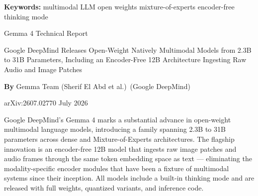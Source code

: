 \documentclass[10pt,twocolumn]{article}
\begin{document}
\setlength{\parindent}{0pt}
\setlength{\parskip}{4pt}

{\small\color{keywordgray}\textbf{Keywords:}
  multimodal LLM \textbullet{}
  open weights \textbullet{}
  mixture-of-experts \textbullet{}
  encoder-free \textbullet{}
  thinking mode}\par\vspace{4pt}

{\LARGE\bfseries\raggedright
  Gemma 4 Technical Report}\par\vspace{4pt}

{\large\itshape\raggedright
  Google DeepMind Releases Open-Weight Natively Multimodal Models
  from 2.3B to 31B Parameters, Including an Encoder-Free 12B
  Architecture Ingesting Raw Audio and Image Patches}\par\vspace{6pt}

{\small\textbf{By} Gemma Team (Sherif El Abd et al.)\
  (Google DeepMind)}\par\vspace{2pt}

{\small\color{keywordgray}arXiv:2607.02770 \textbullet{}
  July 2026}
\par\vspace{2pt}\noindent{\color{rulered}\rule{\columnwidth}{0.6pt}}\vspace{6pt}

Google DeepMind's Gemma 4 marks a substantial advance in open-weight
multimodal language models, introducing a family spanning 2.3B to 31B
parameters across dense and Mixture-of-Experts architectures.
The flagship innovation is an encoder-free 12B model that ingests
raw image patches and audio frames through the same token embedding
space as text --- eliminating the modality-specific encoder modules
that have been a fixture of multimodal systems since their inception.
All models include a built-in thinking mode and are released with
full weights, quantized variants, and inference code.
\end{document}
